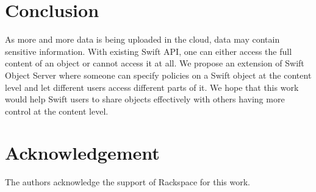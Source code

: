 \section{Conclusion}
As more and more data is being uploaded in the cloud, data may contain sensitive information. With existing Swift API, one can either access the full content of an object or cannot access it at all. We  propose an extension of Swift Object Server where someone can specify  policies on a Swift object at the content level  and let different users access different parts of it.  We hope that this work would help Swift users to share objects effectively with others having more control at the content level.

\section*{Acknowledgement}

The authors acknowledge the support of Rackspace for this work.